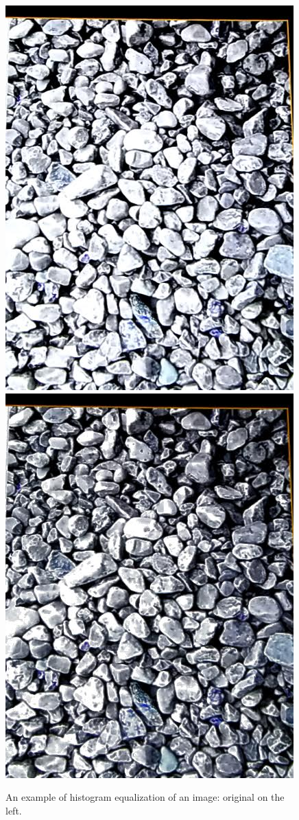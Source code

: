 \documentclass[11pt, letterpaper]{article}
\begin{document}
\begin{figure}[hbtp]
\centering
\includegraphics[scale=0.3]{img/histeq1.jpg}
\includegraphics[scale=0.3]{img/histeq2.jpg}
\caption{An example of histogram equalization of an image: original on the left.}
\label{fig:histogram}
\end{figure}
\end{document}
